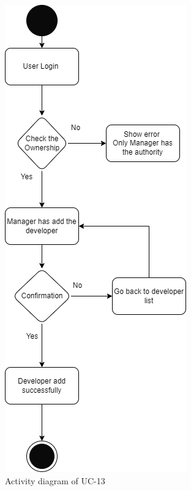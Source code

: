 \begin{figure}[H]
    \centering
    \includegraphics[scale=0.7]{./diagrams/Activity Diagram/ad-13.png}
    \caption{Activity diagram of UC-13}
    \label{fig:act-13}

\end{figure}


